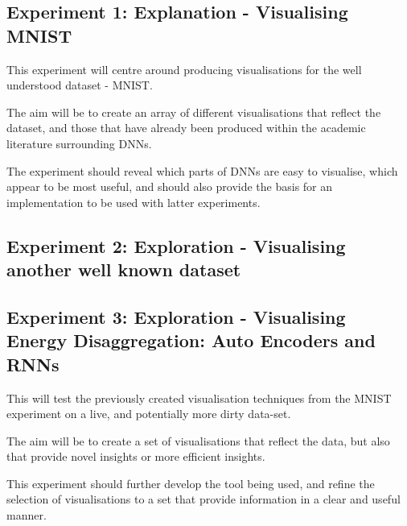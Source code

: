 \documentclass[a4paper,11pt,titlepage]{article}
\begin{document}
	\subsection{Experiment 1: Explanation - Visualising MNIST}
	This experiment will centre around producing visualisations for the well understood dataset - MNIST.
	\par 
	The aim will be to create an array of different visualisations that reflect the dataset, and those that have already been produced within the academic literature surrounding DNNs.
	\par 
	The experiment should reveal which parts of DNNs are easy to visualise, which appear to be most useful, and should also provide the basis for an implementation to be used with latter experiments.  

	\subsection{Experiment 2: Exploration - Visualising another well known dataset}



	\subsection{Experiment 3: Exploration - Visualising Energy Disaggregation: Auto Encoders and RNNs}
	This will test the previously created visualisation techniques from the MNIST experiment on a live, and potentially more dirty data-set.
	\par 
	The aim will be to create a set of visualisations that reflect the data, but also that provide novel insights or more efficient insights.
	\par 
	This experiment should further develop the tool being used, and refine the selection of visualisations to a set that provide information in a clear and useful manner. \cite{Shoresh2011} \cite{Maaten2008}

\clearpage




\clearpage
\appendix
\end{document}
